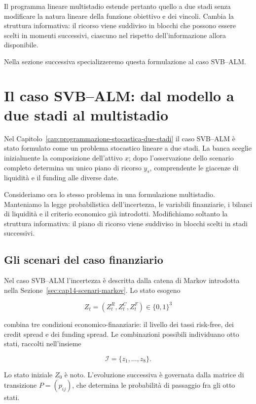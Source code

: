 Il programma lineare multistadio
estende pertanto quello a due stadi
senza modificare la natura lineare
della funzione obiettivo e dei vincoli.
Cambia la struttura informativa:
il ricorso viene suddiviso in
blocchi che possono essere scelti
in momenti successivi, ciascuno
nel rispetto dell'informazione
allora disponibile.

Nella sezione successiva
specializzeremo questa
formulazione al caso SVB--ALM.

\section{Il caso SVB--ALM: dal modello a due stadi al multistadio}

\label{sec:cap15-svb-alm-multistadio-v2}

Nel Capitolo~\ref{cap:programmazione-stocastica-due-stadi}
il caso SVB--ALM \`e stato formulato come un problema
stocastico lineare a due stadi. La banca sceglie
inizialmente la composizione dell'attivo $x$; dopo
l'osservazione dello scenario completo determina
un unico piano di ricorso $y_s$, comprendente
le giacenze di liquidit\`a e il funding
alle diverse date.

Consideriamo ora lo stesso problema in una
formulazione multistadio. Manteniamo la legge
probabilistica dell'incertezza, le variabili
finanziarie, i bilanci di liquidit\`a e il
criterio economico gi\`a introdotti.
Modifichiamo soltanto la struttura informativa:
il piano di ricorso viene suddiviso in blocchi
scelti in stadi successivi.

\subsection{Gli scenari del caso finanziario}

Nel caso SVB--ALM l'incertezza \`e descritta
dalla catena di Markov introdotta nella
Sezione~\ref{sec:cap14-scenari-markov}.
Lo stato esogeno

\[
Z_t=(Z_t^R,Z_t^C,Z_t^F)\in\{0,1\}^3
\]

combina tre condizioni economico-finanziarie:
il livello dei tassi risk-free, dei credit spread
e dei funding spread. Le combinazioni possibili
individuano otto stati, raccolti nell'insieme

\[
\mathcal I=\{z_1,\ldots,z_8\}.
\]

Lo stato iniziale $Z_0$ \`e noto.
L'evoluzione successiva \`e governata
dalla matrice di transizione $P=(p_{ij})$,
che determina le probabilit\`a di passaggio
fra gli otto stati.

